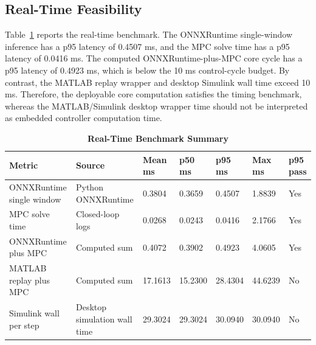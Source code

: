 \documentclass{ieeeaccess}
\begin{document}
\subsection{Real-Time Feasibility}

Table~\ref{tab:realtime} reports the real-time benchmark. The ONNXRuntime single-window inference has a p95 latency of 0.4507 ms, and the MPC solve time has a p95 latency of 0.0416 ms. The computed ONNXRuntime-plus-MPC core cycle has a p95 latency of 0.4923 ms, which is below the 10 ms control-cycle budget. By contrast, the MATLAB replay wrapper and desktop Simulink wall time exceed 10 ms. Therefore, the deployable core computation satisfies the timing benchmark, whereas the MATLAB/Simulink desktop wrapper time should not be interpreted as embedded controller computation time.

\begin{table}[!t]

\caption{\textbf{Real-Time Benchmark Summary}}

\label{tab:realtime}

\setlength{\tabcolsep}{4pt}

\begin{tabular}{|p{125pt}|p{78pt}|p{45pt}|p{45pt}|p{45pt}|p{50pt}|p{45pt}|}

\hline

Metric & Source & Mean ms & p50 ms & p95 ms & Max ms & p95 pass \\

\hline

ONNXRuntime single window & Python ONNXRuntime & 0.3804 & 0.3659 & 0.4507 & 1.8839 & Yes \\

MPC solve time & Closed-loop logs & 0.0268 & 0.0243 & 0.0416 & 2.1766 & Yes \\

ONNXRuntime plus MPC & Computed sum & 0.4072 & 0.3902 & 0.4923 & 4.0605 & Yes \\

MATLAB replay plus MPC & Computed sum & 17.1613 & 15.2300 & 28.4304 & 44.6239 & No \\

Simulink wall per step & Desktop simulation wall time & 29.3024 & 29.3024 & 30.0940 & 30.0940 & No \\

\hline

\end{tabular}

\end{table}
\end{document}
